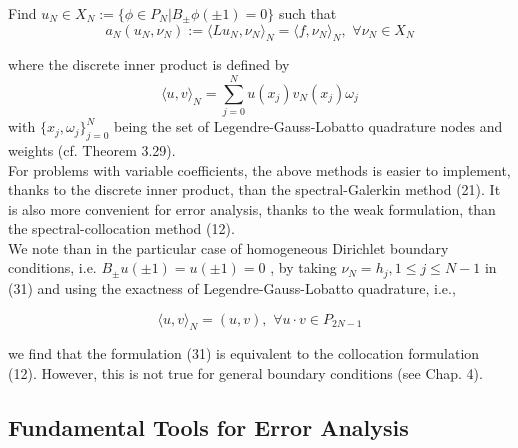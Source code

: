 \begin{center}
	Find $ u_{ N } \in X_{ N } := \{ \phi \in P_{ N } \vert B_{ \pm } \phi ( \pm 1) = 0 \} $ such that
	\begin{equation}
		a_{ N } \left( u_{ N }, \nu_{ N } \right) := \langle L u_{ N }, \nu_{ N } \rangle_{ N } = \langle f, \nu_{ N } \rangle_{ N }, \hspace{4pt} \forall \nu_{ N } \in X_{ N }
	\end{equation}
	
\end{center}
where the discrete inner product is defined by 
\begin{equation}
	\langle u,v \rangle_{ N } = \sum_{ j=0 }^{ N } u(x_{ j }) v_{ N } (x_{ j }) \omega_{ j }
\end{equation}
with $ \{ x_{ j }, \omega_{ j } \}_{ j=0 }^{ N } $ being the set of Legendre-Gauss-Lobatto quadrature nodes and weights (cf. Theorem 3.29). \\

\indent For problems with variable coefficients, the above methods is easier to implement, thanks to the discrete inner product, than the spectral-Galerkin method (21). It is also more convenient for error analysis, thanks to the weak formulation, than the spectral-collocation method (12). \\
\indent We note than in the particular case of homogeneous Dirichlet boundary conditions, i.e. $ B_{ \pm }u( \pm 1) = u(\pm 1) = 0 $ , by taking $ \nu_{ N } = h_{ j }, 1 \leq j \leq N-1 $ in (31) and using the exactness of Legendre-Gauss-Lobatto quadrature, i.e.,

\begin{equation}
	\langle u, v \rangle_{ N } = \left( u,v \right), \hspace{4pt} \forall u \cdot v \in P_{ 2N-1 }
\end{equation}

we find that the formulation (31) is equivalent to the collocation formulation (12). However, this is not true for general boundary conditions (see Chap. 4).

\subsection{Fundamental Tools for Error Analysis}
